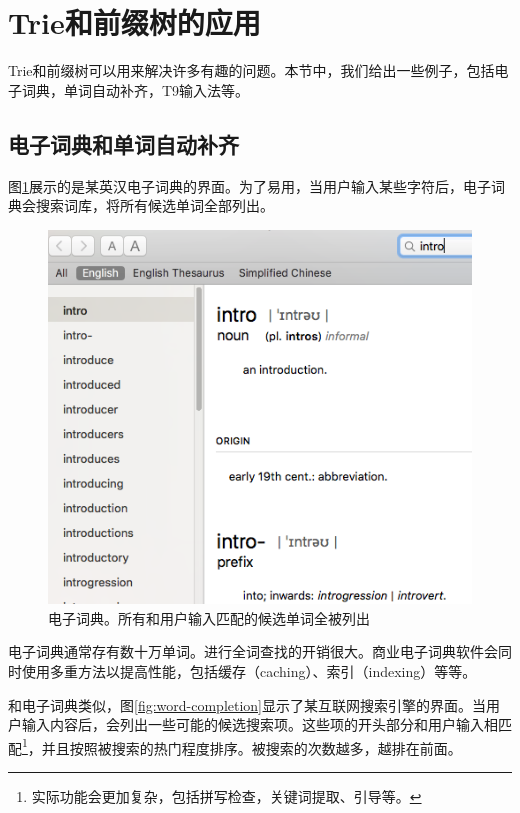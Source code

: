 \documentclass[b5paper]{ctexart}
\begin{document}
\section{Trie和前缀树的应用}

Trie和前缀树可以用来解决许多有趣的问题。本节中，我们给出一些例子，包括电子词典，单词自动补齐，T9输入法等。

\subsection{电子词典和单词自动补齐}
图\ref{fig:e-dict}展示的是某英汉电子词典的界面。为了易用，当用户输入某些字符后，电子词典会搜索词库，将所有候选单词全部列出。

\begin{figure}[htbp]
  \centering
  \includegraphics[scale=0.5]{img/edict-en.png}
  \caption{电子词典。所有和用户输入匹配的候选单词全被列出}
  \label{fig:e-dict}
\end{figure}

电子词典通常存有数十万单词。进行全词查找的开销很大。商业电子词典软件会同时使用多重方法以提高性能，包括缓存（caching）、索引（indexing）等等。

和电子词典类似，图\ref{fig:word-completion}显示了某互联网搜索引擎的界面。当用户输入内容后，会列出一些可能的候选搜索项。这些项的开头部分和用户输入相匹配\footnote{实际功能会更加复杂，包括拼写检查，关键词提取、引导等。}，并且按照被搜索的热门程度排序。被搜索的次数越多，越排在前面。
\end{document}
